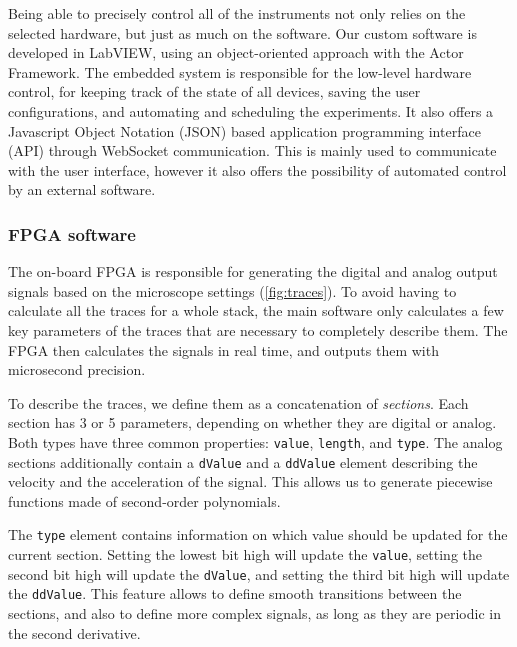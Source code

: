     Being able to precisely control all of the instruments not only relies on the selected hardware, but just as much on the software. Our custom software is developed in LabVIEW, using an object-oriented approach with the Actor Framework. The embedded system is responsible for the low-level hardware control, for keeping track of the state of all devices, saving the user configurations, and automating and scheduling the experiments. It also offers a Javascript Object Notation (JSON) based application programming interface (API) through WebSocket communication. This is mainly used to communicate with the user interface, however it also offers the possibility of automated control by an external software.

    \subsubsection{FPGA software}
      The on-board FPGA is responsible for generating the digital and analog output signals based on the microscope settings (\autoref{fig:traces}). To avoid having to calculate all the traces for a whole stack, the main software only calculates a few key parameters of the traces that are necessary to completely describe them. The FPGA then calculates the signals in real time, and outputs them with microsecond precision.

      To describe the traces, we define them as a concatenation of \textit{sections}. Each section has 3 or 5 parameters, depending on whether they are digital or analog. Both types have three common properties: \texttt{value}, \texttt{length}, and \texttt{type}. The analog sections additionally contain a \texttt{dValue} and a \texttt{ddValue} element describing the velocity and the acceleration of the signal. This allows us to generate piecewise functions made of second-order polynomials.

      The \texttt{type} element contains information on which value should be updated for the current section. Setting the lowest bit high will update the \texttt{value}, setting the second bit high will update the \texttt{dValue}, and setting the third bit high will update the \texttt{ddValue}. This feature allows to define smooth transitions between the sections, and also to define more complex signals, as long as they are periodic in the second derivative.



